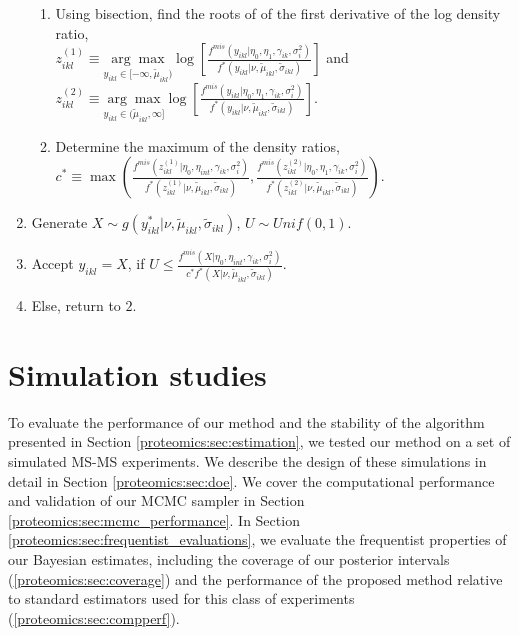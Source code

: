 \begin{algorithm}
\begin{enumerate}
\begin{enumerate}
\item Using bisection, find the roots of of the first derivative of the
log density ratio, \\
$z_{ikl}^{(1)}\equiv\underset{y_{ikl}\in[-\infty,\tilde{\mu}_{ikl})}{\arg\max}\log\left[\frac{f^{mis}(y_{ikl}\vert\eta_{0},\eta_{1},\gamma_{ik},\sigma_{i}^{2})}{f^*(y_{ikl}\vert\nu,\tilde{\mu}_{ikl},\tilde{\sigma}_{ikl})}\right]$
and $z_{ikl}^{(2)}\equiv\underset{y_{ikl}\in(\tilde{\mu}_{ikl},\infty]}{\arg\max}\log\left[\frac{f^{mis}(y_{ikl}\vert\eta_{0},\eta_{1},\gamma_{ik},\sigma_{i}^{2})}{f^*(y_{ikl}\vert\nu,\tilde{\mu}_{ikl},\tilde{\sigma}_{ikl})}\right]$.
\item Determine the maximum of the density ratios,\\
 $c^* \equiv \max\left(\frac{f^{mis}(z_{ikl}^{(1)}\vert\eta_{0},\eta_{int},\gamma_{ik},\sigma_{i}^{2})}{f^*(z_{ikl}^{(1)}\vert\nu,\tilde{\mu}_{ikl},\tilde{\sigma}_{ikl})},\frac{f^{mis}(z_{ikl}^{(2)}\vert\eta_{0},\eta_{1},\gamma_{ik},\sigma_{i}^{2})}{f^*(z_{ikl}^{(2)}\vert\nu,\tilde{\mu}_{ikl},\tilde{\sigma}_{ikl})}\right)$.
\end{enumerate}
\item Generate $X\sim g(y_{ikl}^{*}\vert\nu,\tilde{\mu}_{ikl},\tilde{\sigma}_{ikl})$,
$U\sim Unif(0,1)$.
\item Accept $y_{ikl}=X$, if $U\leq\frac{f^{mis}(X\vert\eta_{0},\eta_{int},\gamma_{ik},\sigma_{i}^{2})}{c^* f^*(X\vert\nu,\tilde{\mu}_{ikl},\tilde{\sigma}_{ikl})}$.
\item Else, return to $2$.\end{enumerate}
\end{algorithm}




\section{Simulation studies}
\label{proteomics:sec:simulations}

To evaluate the performance of our method and the stability of the algorithm presented in Section \ref{proteomics:sec:estimation}, we tested our method on a set of simulated MS-MS experiments.
We describe the design of these simulations in detail in Section \ref{proteomics:sec:doe}.
We cover the computational performance and validation of our MCMC sampler in Section \ref{proteomics:sec:mcmc_performance}.
In Section \ref{proteomics:sec:frequentist_evaluations}, we evaluate the frequentist properties of our Bayesian estimates, including the coverage of our posterior intervals (\ref{proteomics:sec:coverage}) and the performance of the proposed method relative to standard estimators used for this class of experiments (\ref{proteomics:sec:compperf}).

